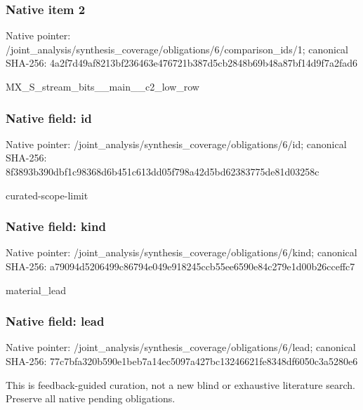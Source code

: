 \documentclass[10pt,a4paper]{article}
\begin{document}
\subsubsection{Native item 2}
Native pointer: /joint\_\allowbreak{}analysis/synthesis\_\allowbreak{}coverage/obligations/6/comparison\_\allowbreak{}ids/1; canonical SHA-256: 4a2f7d49af8213bf236463e476721b387d5cb2848b69b48a87bf14d9f7a2fad6

\begingroup\raggedright\sloppy MX\_\allowbreak{}S\_\allowbreak{}stream\_\allowbreak{}bits\_\allowbreak{}\_\allowbreak{}main\_\allowbreak{}\_\allowbreak{}c2\_\allowbreak{}low\_\allowbreak{}row\par\endgroup

\subsubsection{Native field: id}
Native pointer: /joint\_\allowbreak{}analysis/synthesis\_\allowbreak{}coverage/obligations/6/id; canonical SHA-256: 8f3893b390dbf1c98368d6b451c613dd05f798a42d5bd62383775de81d03258c

\begingroup\raggedright\sloppy curated-scope-limit\par\endgroup

\subsubsection{Native field: kind}
Native pointer: /joint\_\allowbreak{}analysis/synthesis\_\allowbreak{}coverage/obligations/6/kind; canonical SHA-256: a79094d5206499c86794e049e918245ccb55ee6590e84c279e1d00b26cceffc7

\begingroup\raggedright\sloppy material\_\allowbreak{}lead\par\endgroup

\subsubsection{Native field: lead}
Native pointer: /joint\_\allowbreak{}analysis/synthesis\_\allowbreak{}coverage/obligations/6/lead; canonical SHA-256: 77c7bfa320b590e1beb7a14ec5097a427bc13246621fe8348df6050c3a5280e6

\begingroup\raggedright\sloppy This is feedback-guided curation,\allowbreak{} not a new blind or exhaustive literature search. Preserve all native pending obligations.\par\endgroup
\end{document}
